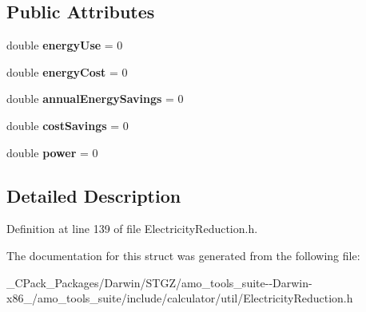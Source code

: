 \subsection*{Public Attributes}
\begin{DoxyCompactItemize}
\item 
\mbox{\label{struct_electricity_reduction_1_1_output_ae92209a51a974bdc3918e5f6d4045a79}} 
double {\bfseries energy\+Use} = 0
\item 
\mbox{\label{struct_electricity_reduction_1_1_output_abba49b6b22b004878962b7814aef4a3d}} 
double {\bfseries energy\+Cost} = 0
\item 
\mbox{\label{struct_electricity_reduction_1_1_output_afabd372538881f4d9c14281a8e1b5a0d}} 
double {\bfseries annual\+Energy\+Savings} = 0
\item 
\mbox{\label{struct_electricity_reduction_1_1_output_a5d13f57eaf33af3fe295036028311ea4}} 
double {\bfseries cost\+Savings} = 0
\item 
\mbox{\label{struct_electricity_reduction_1_1_output_a402b2cb604d2dd8e5ba130a44b815860}} 
double {\bfseries power} = 0
\end{DoxyCompactItemize}


\subsection{Detailed Description}


Definition at line 139 of file Electricity\+Reduction.\+h.



The documentation for this struct was generated from the following file\+:\begin{DoxyCompactItemize}
\item 
\+\_\+\+C\+Pack\+\_\+\+Packages/\+Darwin/\+S\+T\+G\+Z/amo\+\_\+tools\+\_\+suite-\/-\/\+Darwin-\/x86\+\_/amo\+\_\+tools\+\_\+suite/include/calculator/util/Electricity\+Reduction.\+h\end{DoxyCompactItemize}
